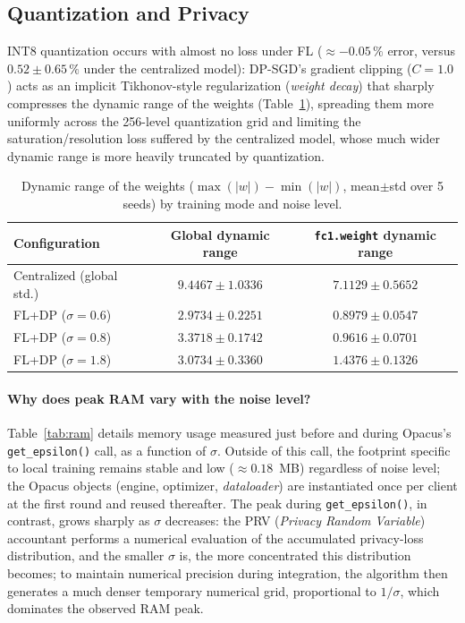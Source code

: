 \documentclass{acmart}
\begin{document}
\subsection{Quantization and Privacy}

INT8 quantization occurs with almost no loss under FL ($\approx-0.05\,\%$ error,
versus $0.52\pm0.65\,\%$ under the centralized model): DP-SGD's gradient clipping
($C=1.0$) acts as an implicit Tikhonov-style regularization (\textit{weight decay})
that sharply compresses the dynamic range of the weights (Table~\ref{tab:dynrange}),
spreading them more uniformly across the 256-level quantization grid and limiting the
saturation/resolution loss suffered by the centralized model, whose much wider dynamic
range is more heavily truncated by quantization.

\begin{table}[h!]
\centering
\small
\caption{Dynamic range of the weights ($\max(|w|)-\min(|w|)$, mean$\pm$std over
5 seeds) by training mode and noise level.}
\label{tab:dynrange}
\begin{tabular}{lcc}
\toprule
Configuration & Global dynamic range & \texttt{fc1.weight} dynamic range \\
\midrule
Centralized (global std.)  & $9.4467\pm1.0336$ & $7.1129\pm0.5652$ \\
FL+DP ($\sigma=0.6$)        & $2.9734\pm0.2251$ & $0.8979\pm0.0547$ \\
FL+DP ($\sigma=0.8$)        & $3.3718\pm0.1742$ & $0.9616\pm0.0701$ \\
FL+DP ($\sigma=1.8$)        & $3.0734\pm0.3360$ & $1.4376\pm0.1326$ \\
\bottomrule
\end{tabular}
\end{table}

\paragraph{Why does peak RAM vary with the noise level?} Table~\ref{tab:ram} details
memory usage measured just before and during Opacus's \texttt{get\_epsilon()} call,
as a function of $\sigma$. Outside of this call, the footprint specific to local
training remains stable and low ($\approx0.18$~MB) regardless of noise level; the
Opacus objects (engine, optimizer, \textit{dataloader}) are instantiated once per
client at the first round and reused thereafter. The peak during
\texttt{get\_epsilon()}, in contrast, grows sharply as $\sigma$ decreases: the PRV
(\textit{Privacy Random Variable}) accountant performs a numerical evaluation of the
accumulated privacy-loss distribution, and the smaller $\sigma$ is, the more
concentrated this distribution becomes; to maintain numerical precision during
integration, the algorithm then generates a much denser temporary numerical grid,
proportional to $1/\sigma$, which dominates the observed RAM peak.
\end{document}
